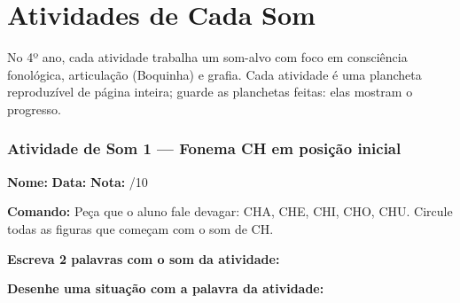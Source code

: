 
\chapter{Atividades de Cada Som}

No 4º ano, cada atividade trabalha um som-alvo com foco em consciência fonológica, articulação (Boquinha) e grafia. Cada atividade é uma plancheta reproduzível de página inteira; guarde as planchetas feitas: elas mostram o progresso.



\subsection{Atividade de Som 1 --- Fonema CH em posição inicial}
\begin{exercicio}



\noindent\textbf{Nome:} \underline{\hspace{3.2cm}} \quad \textbf{Data:} \underline{\hspace{1.6cm}} \quad \textbf{Nota:} \underline{\hspace{0.9cm}}/10


\noindent\textbf{Comando:} Peça que o aluno fale devagar: CHA, CHE, CHI, CHO, CHU. Circule todas as figuras que começam com o som de CH.


\begin{center}
\end{center}

\noindent\textbf{Escreva 2 palavras com o som da atividade:}

\begin{center}
  \underline{\hspace{3cm}} \quad \underline{\hspace{3cm}}
\end{center}

\noindent\textbf{Desenhe uma situação com a palavra da atividade:}

\begin{center}
\end{center}

\end{exercicio}

